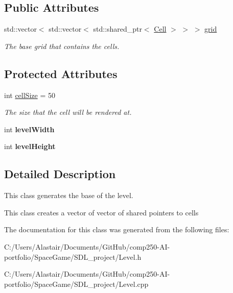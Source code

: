 \subsection*{Public Attributes}
\begin{DoxyCompactItemize}
\item 
\mbox{\label{class_level_a48cd01c916a30fa65a72ccca7ad79fe1}} 
std\+::vector$<$ std\+::vector$<$ std\+::shared\+\_\+ptr$<$ \hyperlink{class_cell}{Cell} $>$ $>$ $>$ \hyperlink{class_level_a48cd01c916a30fa65a72ccca7ad79fe1}{grid}
\begin{DoxyCompactList}\small\item\em The base grid that contains the cells. \end{DoxyCompactList}\end{DoxyCompactItemize}
\subsection*{Protected Attributes}
\begin{DoxyCompactItemize}
\item 
\mbox{\label{class_level_a50fe4de705aaa281592ddc26c21362ec}} 
int \hyperlink{class_level_a50fe4de705aaa281592ddc26c21362ec}{cell\+Size} = 50
\begin{DoxyCompactList}\small\item\em The size that the cell will be rendered at. \end{DoxyCompactList}\item 
\mbox{\label{class_level_a96a0acf0f21c6d980f9b8c75f13b1672}} 
int {\bfseries level\+Width}
\item 
\mbox{\label{class_level_a629c045305fc11af293d710df7cadc5e}} 
int {\bfseries level\+Height}
\end{DoxyCompactItemize}


\subsection{Detailed Description}
This class generates the base of the level. 

This class creates a vector of vector of shared pointers to cells 

The documentation for this class was generated from the following files\+:\begin{DoxyCompactItemize}
\item 
C\+:/\+Users/\+Alastair/\+Documents/\+Git\+Hub/comp250-\/\+A\+I-\/portfolio/\+Space\+Game/\+S\+D\+L\+\_\+project/Level.\+h\item 
C\+:/\+Users/\+Alastair/\+Documents/\+Git\+Hub/comp250-\/\+A\+I-\/portfolio/\+Space\+Game/\+S\+D\+L\+\_\+project/Level.\+cpp\end{DoxyCompactItemize}
